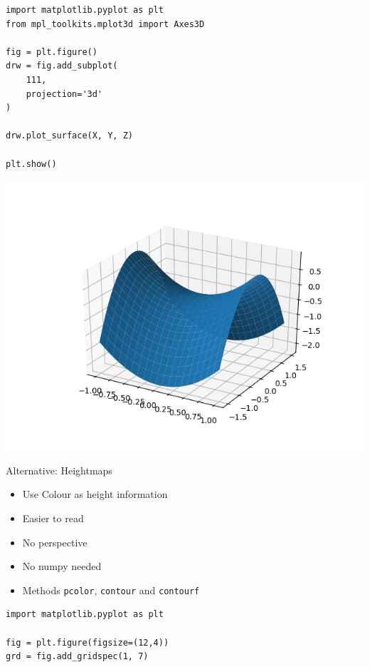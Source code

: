 \begin{frame}[fragile]
%
\begin{tcbraster}[raster columns=2,
                  raster equal height,
                  nobeforeafter,
                  raster column skip=0.2cm]
\begin{codebox}
\begin{verbatim}
import matplotlib.pyplot as plt
from mpl_toolkits.mplot3d import Axes3D

fig = plt.figure()
drw = fig.add_subplot(
    111,
    projection='3d'
)

drw.plot_surface(X, Y, Z)

plt.show()
\end{verbatim}
\end{codebox}
%
\begin{tcolorbox}[title=Output: Wireframe]
	\includegraphics[width=\linewidth]{./gfx/plt-surface3D}
\end{tcolorbox}
\end{tcbraster}
%
\end{frame}


\begin{frame}[fragile]{Alternative: Heightmaps}
%
\begin{itemize}
\item Use Colour as height information
\item Easier to read
\item No perspective
\item No numpy needed
\item Methods \texttt{pcolor}, \texttt{contour} and \texttt{contourf}
\end{itemize}
%
\begin{codebox}
\begin{verbatim}
import matplotlib.pyplot as plt

fig = plt.figure(figsize=(12,4))
grd = fig.add_gridspec(1, 7)
\end{verbatim}
\end{codebox}
%
\end{frame}

